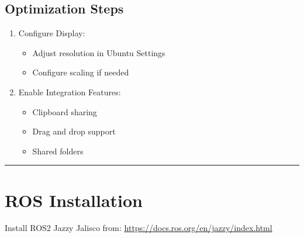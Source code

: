 \documentclass[11pt,a4paper]{article}
\begin{document}
\subsection{Optimization Steps}
\begin{enumerate}
    \item Configure Display:
    \begin{itemize}
        \item Adjust resolution in Ubuntu Settings
        \item Configure scaling if needed
    \end{itemize}
    \item Enable Integration Features:
    \begin{itemize}
        \item Clipboard sharing
        \item Drag and drop support
        \item Shared folders
    \end{itemize}
\end{enumerate}

\noindent\rule{\textwidth}{1pt}

\section{ROS Installation}
Install ROS2 Jazzy Jalisco from: \hyperlink{ROS2}{https://docs.ros.org/en/jazzy/index.html}

\end{document}
